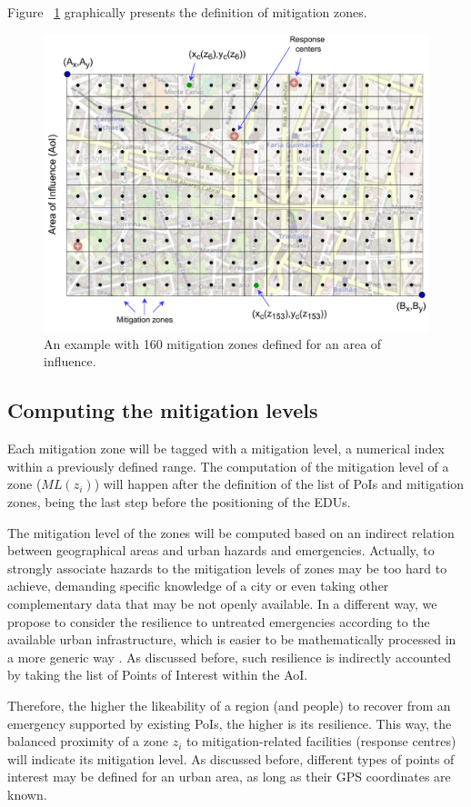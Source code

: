 \begin{refsection}
Figure ~\ref{Fig:figGrid} graphically presents the definition of mitigation zones.

\begin{figure}[htb!]
    \centering
    \includegraphics[width=0.77\linewidth]{Chapters/2-EDUs/images/MitigationZones.pdf}
    \caption{An example with 160 mitigation zones defined for an area of influence.}
    \label{Fig:figGrid}
\end{figure}

%
\subsection {Computing the mitigation levels}

Each mitigation zone will be tagged with a mitigation level, a numerical index within a previously defined range. The computation of the mitigation level of a zone ($ML(z_i)$) will happen after the definition of the list of PoIs and mitigation zones, being the last step before the positioning of the EDUs. 

The mitigation level of the zones will be computed based on an indirect relation between geographical areas and urban hazards and emergencies. Actually, to strongly associate hazards to the mitigation levels of zones may be too hard to achieve, demanding specific knowledge of a city or even taking other complementary data that may be not openly available. In a different way, we propose to consider the resilience to untreated emergencies according to the available urban infrastructure, which is easier to be mathematically processed in a more generic way \cite{emergencies1}. As discussed before, such resilience is indirectly accounted by taking the list of Points of Interest within the AoI.

Therefore, the higher the likeability of a region (and people) to recover from an emergency supported by existing PoIs, the higher is its resilience. This way, the balanced proximity of a zone $z_i$ to mitigation-related facilities (response centres) will indicate its mitigation level. As discussed before, different types of points of interest may be defined for an urban area, as long as their GPS coordinates are known.


\end{refsection}
